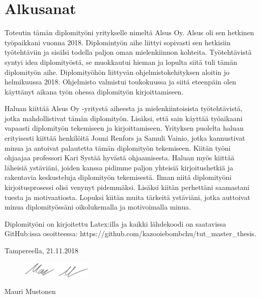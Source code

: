 \chapter*{Alkusanat}
\label{ch:alkusanat}
Toteutin tämän diplomityöni yritykselle nimeltä Alsus Oy. Alsus oli sen hetkinen työpaikkani vuonna 2018. Diplomintyön aihe liittyi sopivasti sen hetkisiin työtehtäviin ja sisälsi todella paljon oman mielenkiinnon kohteita. Työtehtävistä syntyi idea diplomityöstä, se muokkautui hieman ja lopulta siitä tuli tämän diplomityön aihe. Diplomityöhön liittyvän ohjelmistokehityksen aloitin jo helmikuussa 2018. Ohjelmisto valmistui toukokuussa ja siitä eteenpäin olen käyttänyt aikana työn ohessa diplomityön kirjoittamiseen.

Haluan kiittää Alsus Oy -yritystä aiheesta ja mielenkiintoisista työtehtävistä, jotka mahdollistivat tämän diplomityön. Lisäksi, että sain käyttää työaikaani vapaasti diplomityön tekemiseen ja kirjoittamiseen. Yrityksen puolelta haluan erityisesti kiittää henkilöitä Jouni Renfors ja Samuli Vainio, jotka kannustivat minua ja antoivat palautetta tämän diplomityön tekemiseen. Kiitän työni ohjaajaa professori Kari Systää hyvästä ohjaamisesta. Haluan myös kiittää läheisiä ystäviäni, joiden kanssa pidimme paljon yhteisiä kirjoitushetkiä ja rakentavia keskusteluja diplomityön tekemisestä. Ilman niitä diplomityöni kirjoitusprosessi olisi venynyt pidemmäksi. Lisäksi kiitän perhettäni saamastani tuesta ja motivaatiosta. Lopuksi kiitän muita tärkeitä ystäviäni, jotka auttoivat minua diplomityössäni oikolukemalla ja motivoimalla minua.

Diplomityöni on kirjoitettu Latex:illa ja kaikki lähdekoodi on saatavissa GitHub:issa osoitteessa: https://github.com/kazooiebombchu/tut\_master\_thesis.

\vspace{2\baselineskip}

Tampereella, 21.11.2018

\begin{figure}[ht!]
	\includegraphics[width=0.3\textwidth,left]{pictures/signature.png}
\end{figure}

Mauri Mustonen